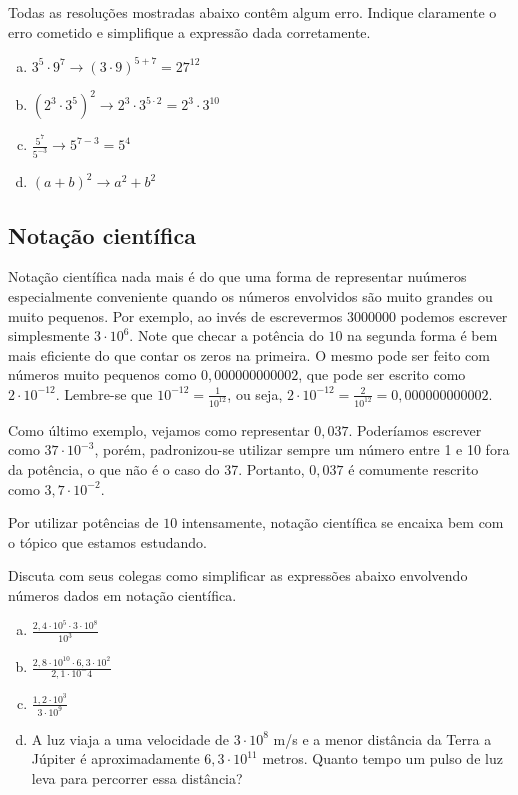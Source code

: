\documentclass[main_estudante.tex]{subfiles}
\begin{document}
\begin{questao}
Todas as resoluções mostradas abaixo contêm algum erro. Indique claramente o erro cometido e simplifique a expressão dada corretamente.
\begin{enumerate}[a)]
\item $3^5 \cdot 9^7  \longrightarrow (3 \cdot 9)^{5+7} = 27^{12}$
\item $(2^3 \cdot 3^5)^2  \longrightarrow 2^3 \cdot 3^{5 \cdot 2} = 2^3 \cdot 3^{10}$
\item $\frac{5^7}{5^{-3}}  \longrightarrow 5^{7-3}=5^4$
\item $(a+b)^2 \longrightarrow a^2+b^2$
\end{enumerate}
\end{questao}

\subsection*{Notação científica}

Notação científica nada mais é do que uma forma de representar nuúmeros especialmente conveniente quando os números envolvidos são muito grandes ou muito pequenos. Por exemplo, ao invés de escrevermos $3000000$ podemos escrever simplesmente $3 \cdot 10^6$. Note que checar a potência do $10$ na segunda forma é bem mais eficiente do que contar os zeros na primeira. O mesmo pode ser feito com números muito pequenos como $0,000000000002$, que pode ser escrito como $2 \cdot 10^{-12}$. Lembre-se que $10^{-12} = \frac{1}{10^12}$, ou seja, $2 \cdot 10^{-12} = \frac{2}{10^12} = 0,000000000002$.

Como último exemplo, vejamos como representar $0,037$. Poderíamos escrever como $37 \cdot 10^{-3}$, porém, padronizou-se utilizar sempre um número entre 1 e 10 fora da potência, o que não é o caso do 37. Portanto, $0,037$ é comumente rescrito como $3,7 \cdot 10^{-2}$.

Por utilizar potências de $10$ intensamente, notação científica se encaixa bem com o tópico que estamos estudando.

\begin{questao}
Discuta com seus colegas como simplificar as expressões abaixo envolvendo números dados em notação científica.
\begin{enumerate}[a)]
\item $\frac{2,4  \cdot 10^5 \cdot 3  \cdot 10^8}{10^3}$
\item $\frac{2,8  \cdot 10^{10} \cdot 6,3  \cdot 10^2}{2,1 \cdot 10^-4}$
\item $\frac{1,2  \cdot 10^3}{3 \cdot 10^9}$
\item A luz viaja a uma velocidade de $3 \cdot 10^8$ m/s e a menor distância da Terra a Júpiter é aproximadamente $6,3 \cdot 10^{11}$ metros. Quanto tempo um pulso de luz leva para percorrer essa distância?
\end{enumerate}
\end{questao}
\end{document}
